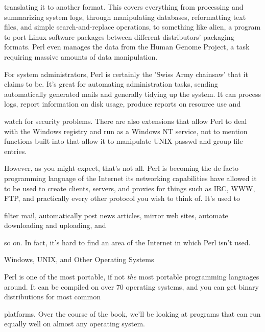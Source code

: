 \documentclass[a4paper,11pt]{book}
\begin{document}
\noindent translating it to another format. This covers everything from processing and summarizing system logs, through manipulating databases, reformatting text files, and simple search-and-replace operations, to something like alien, a program to port Linux software packages between different distributors' packaging formats. Perl even manages the data from the Human Genome Project, a task requiring massive amounts of data manipulation.

\noindent 

\noindent For system administrators, Perl is certainly the 'Swiss Army chainsaw' that it claims to be. It's great for automating administration tasks, sending automatically generated mails and generally tidying up the system. It can process logs, report information on disk usage, produce reports on resource use and

\noindent watch for security problems. There are also extensions that allow Perl to deal with the Windows registry and run as a Windows NT service, not to mention functions built into that allow it to manipulate UNIX passwd and group file entries.

\noindent 

\noindent However, as you might expect, that's not all. Perl is becoming the de facto programming language of the Internet its networking capabilities have allowed it to be used to create clients, servers, and proxies for things such as IRC, WWW, FTP, and practically every other protocol you wish to think of. It's used to

\noindent filter mail, automatically post news articles, mirror web sites, automate downloading and uploading, and

\noindent so on. In fact, it's hard to find an area of the Internet in which Perl isn't used.

\noindent 

\noindent 

\noindent Windows, UNIX, and Other Operating Systems

\noindent 

\noindent Perl is one of the most portable, if not \textit{the }most portable programming languages around. It can be compiled on over 70 operating systems, and you can get binary distributions for most common

\noindent platforms. Over the course of the book, we'll be looking at programs that can run equally well on almost any operating system.

\noindent 
\end{document}
